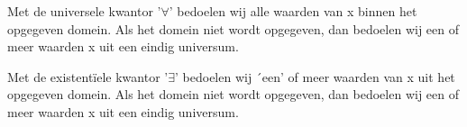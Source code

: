 \documentclass{article}
\begin{document}
	
	
	Met de universele kwantor '$\forall$'  bedoelen wij alle waarden van x binnen het opgegeven
	domein. Als het domein niet wordt opgegeven, dan bedoelen wij een of meer waarden x
	uit een eindig universum. 
	
	
	Met de existentïele kwantor '$\exists$' bedoelen wij ´een' of meer waarden van x uit het opgegeven
	domein. Als het domein niet wordt opgegeven, dan bedoelen wij een of meer waarden x
	uit een eindig universum. 
	
	
	
\end{document}
